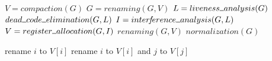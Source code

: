 \documentclass[]{article}
\let\oldnl\nl%
\newcommand{\nonl}{\renewcommand{\nl}{\let\nl\oldnl}}%
\newcommand{\Xund}{\rule{.5em}{.5pt}}
\begin{document}
\begin{algorithm}[] \DontPrintSemicolon {} 
\begin{multicols}{2}
\small

\Indm

\nonl{} {
    $V = compaction(G)$ \;
    $G = renaming(G, V)$ \;
     {
        $L = liveness \Xund analysis(G)$ \;
        $dead \Xund code \Xund elimination(G, L)$ \;
        $I = inter\!f\!erence \Xund analysis(G, L)$ \;
        $V = register \Xund allocation (G, I)$ \;
        $renaming(G, V)$ \;
        $normalization(G)$ \;
    }
}
\vspace{2em}

\nonl{} {
     {
         {
             {
                rename $i$ to $V[i]$ \;
            }
             {
                rename $i$ to $V[i]$ and $j$ to $V[j]$ \;
            }
        }
    }
}
\vspace{2em}


\end{multicols}
\end{algorithm}
\end{document}
